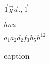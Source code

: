 \documentclass[11pt, oneside]{article}   	%
\begin{document}
$   \vec{1} \vec{g}   \vec{a}  .,\vec{1} $

$\overline{ h nu}$

$a_1 a_2  d_2 f_3 h_5 h^{ 12}$

 \begin{table}[htpb]
	\centering
	\caption{caption}
	\label{tab:label}
	\begin{tabular}{c}
	
	\end{tabular}
\end{table}
\end{document}
